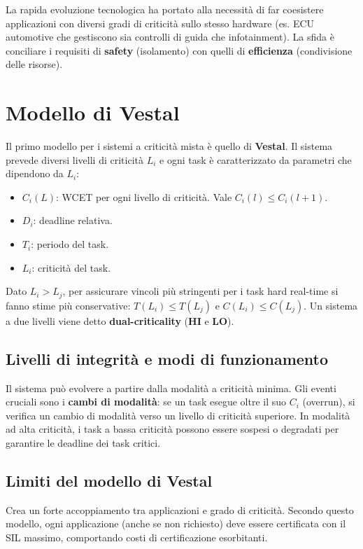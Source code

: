 \documentclass[11pt,a4paper]{report}
\begin{document}
La rapida evoluzione tecnologica ha portato alla necessità di far coesistere applicazioni con diversi gradi di criticità sullo stesso hardware (es. ECU automotive che gestiscono sia controlli di guida che infotainment). La sfida è conciliare i requisiti di \textbf{safety} (isolamento) con quelli di \textbf{efficienza} (condivisione delle risorse).

\section{Modello di Vestal}

Il primo modello per i sistemi a criticità mista è quello di \textbf{Vestal}. Il sistema prevede diversi livelli di criticità $L_i$ e ogni task è caratterizzato da parametri che dipendono da $L_i$:
\begin{itemize}
    \item $C_i(L)$: WCET per ogni livello di criticità. Vale $C_i(l) \le C_i(l+1)$.
    \item $D_i$: deadline relativa.
    \item $T_i$: periodo del task.
    \item $L_i$: criticità del task.
\end{itemize}

Dato $L_i > L_j$, per assicurare vincoli più stringenti per i task hard real-time si fanno stime più conservative: $T(L_i) \le T(L_j)$ e $C(L_i) \le C(L_j)$.
Un sistema a due livelli viene detto \textbf{dual-criticality} (\textbf{HI} e \textbf{LO}).

\subsection{Livelli di integrità e modi di funzionamento}

Il sistema può evolvere a partire dalla modalità a criticità minima. Gli eventi cruciali sono i \textbf{cambi di modalità}: se un task esegue oltre il suo $C_i$ (overrun), si verifica un cambio di modalità verso un livello di criticità superiore. In modalità ad alta criticità, i task a bassa criticità possono essere sospesi o degradati per garantire le deadline dei task critici.

\subsection{Limiti del modello di Vestal}

Crea un forte accoppiamento tra applicazioni e grado di criticità. Secondo questo modello, ogni applicazione (anche se non richiesto) deve essere certificata con il SIL massimo, comportando costi di certificazione esorbitanti.
\end{document}
